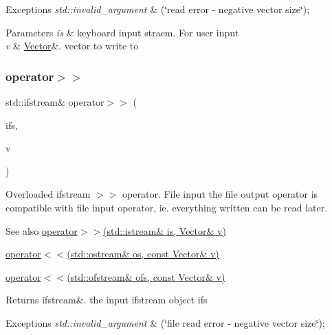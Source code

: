 \begin{DoxyExceptions}{Exceptions}
{\em std\+::invalid\+\_\+argument} & (\char`\"{}read error -\/ negative vector size\char`\"{}); \\
\hline
\end{DoxyExceptions}

\begin{DoxyParams}{Parameters}
{\em is} & keyboard input straem. For user input \\
\hline
{\em v} & \hyperlink{class_vector}{Vector}\&. vector to write to \\
\hline
\end{DoxyParams}
\mbox{\label{class_vector_ab6009b37fac65598b3db164dc4f19fed}} 
\subsubsection{\texorpdfstring{operator$>$$>$}{operator>>}\hspace{0.1cm}{\footnotesize\ttfamily [2/2]}}
{\footnotesize\ttfamily std\+::ifstream\& operator$>$$>$ (\begin{DoxyParamCaption}\item[{std\+::ifstream \&}]{ifs,  }\item[{\hyperlink{class_vector}{Vector} \&}]{v }\end{DoxyParamCaption})\hspace{0.3cm}{\ttfamily [friend]}}

Overloaded ifstream $>$$>$ operator. File input the file output operator is compatible with file input operator, ie. everything written can be read later. \begin{DoxySeeAlso}{See also}
\hyperlink{class_vector_ac198cff0f4196c66649278458eebf227}{operator$>$$>$(std\+::istream\& is, Vector\& v)} 

\hyperlink{class_vector_ac254b27efeb8486ee2f67821e3a21a60}{operator$<$$<$(std\+::ostream\& os, const Vector\& v)} 

\hyperlink{class_vector_a8e755f5550c983df730602890058d990}{operator$<$$<$(std\+::ofstream\& ofs, const Vector\& v)} 
\end{DoxySeeAlso}
\begin{DoxyReturn}{Returns}
ifstream\&. the input ifstream object ifs 
\end{DoxyReturn}

\begin{DoxyExceptions}{Exceptions}
{\em std\+::invalid\+\_\+argument} & (\char`\"{}file read error -\/ negative vector size\char`\"{}); \\
\hline
\end{DoxyExceptions}

